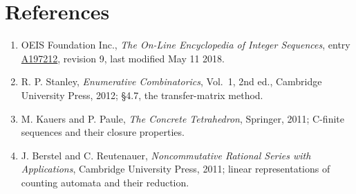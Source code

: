 \documentclass[11pt]{article}
\theoremstyle{definition}
\begin{document}
\section{References}

\begin{enumerate}

\item OEIS Foundation Inc., \emph{The On-Line Encyclopedia of Integer Sequences}, entry \href{https://oeis.org/A197212}{A197212}, revision 9, last modified May 11 2018.

\item R. P. Stanley, \emph{Enumerative Combinatorics}, Vol.~1, 2nd ed., Cambridge University Press, 2012; \S4.7, the transfer-matrix method.

\item M. Kauers and P. Paule, \emph{The Concrete Tetrahedron}, Springer, 2011; C-finite sequences and their closure properties.

\item J. Berstel and C. Reutenauer, \emph{Noncommutative Rational Series with Applications}, Cambridge University Press, 2011; linear representations of counting automata and their reduction.

\end{enumerate}
\end{document}

